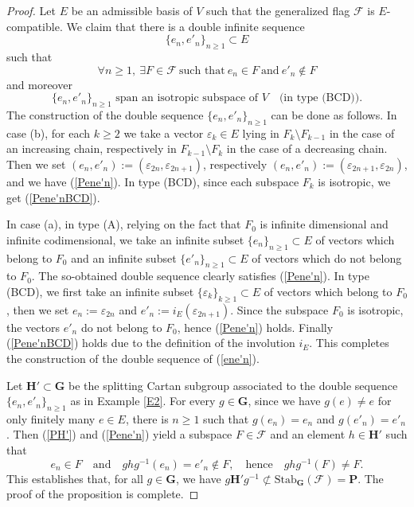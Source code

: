 \documentclass[12pt]{amsart}
\newcommand{\G}{\mathbf{G}}
\renewcommand{\H}{\mathbf{H}}
\renewcommand{\P}{\mathbf{P}}
\newcommand{\Ff}{\mathcal{F}}
\newcommand{\Stab}{\mathrm{Stab}}
\numberwithin{equation}{section}
\theoremstyle{definition}
\begin{document}
\begin{proof}
Let $E$ be an admissible basis of $V$ such that the generalized flag $\Ff$ is $E$-compatible.
We claim that there is a double infinite sequence
\begin{equation}
\label{ene'n}
\{e_n,e'_n\}_{n\geq 1}\subset E
\end{equation}
such that
\begin{equation}
\label{Pene'n}
\forall n\geq 1,\ \exists F\in\Ff\ \mbox{such that}\  e_n\in F\ \mbox{and}\  e'_n\notin F
\end{equation}
and moreover
\begin{equation}
\label{Pene'nBCD}
\mbox{$\{e_n,e'_n\}_{n\geq 1}$ span an isotropic subspace of $V$}\quad\mbox{(in type (BCD)).}
\end{equation}
The construction of the double sequence $\{e_n,e'_n\}_{n\geq 1}$ can be done as follows. In case (b), for each $k\geq 2$ we take a vector $\varepsilon_k\in E$ lying in $F_k\setminus F_{k-1}$ in the case of an increasing chain,
respectively in $F_{k-1}\setminus F_{k}$ in the case of a decreasing chain. 
Then we set $(e_n,e'_n):=(\varepsilon_{2n},\varepsilon_{2n+1})$, respectively $(e_n,e'_n):=(\varepsilon_{2n+1},\varepsilon_{2n})$, 
and we have (\ref{Pene'n}). In type (BCD), since each subspace $F_k$ is isotropic, we get (\ref{Pene'nBCD}).

In case (a), in type (A), relying on the fact that $F_0$ is infinite dimensional and infinite codimensional, we take an infinite subset $\{e_n\}_{n\geq 1}\subset E$ of vectors which belong to $F_0$ and an infinite subset $\{e'_n\}_{n\geq 1}\subset E$ of vectors which do not belong to $F_0$. The so-obtained double sequence clearly satisfies (\ref{Pene'n}). In type (BCD), we first take an infinite subset $\{\varepsilon_k\}_{k\geq 1}\subset E$ of vectors which belong to $F_0$, then we set $e_n:=\varepsilon_{2n}$ and $e'_n:=i_E(\varepsilon_{2n+1})$. Since the subspace $F_0$ is isotropic, the vectors $e'_n$ do not belong to $F_0$, hence (\ref{Pene'n}) holds. Finally (\ref{Pene'nBCD}) holds due to the definition of the involution $i_E$. This completes the construction of the double sequence of (\ref{ene'n}).

Let $\H'\subset \G$ be the splitting Cartan subgroup associated to the double sequence $\{e_n,e'_n\}_{n\geq 1}$ as in Example \ref{E2}.
For every $g\in\G$, since
we have $g(e)\not=e$ for only finitely many $e\in E$, there is $n\geq 1$ such that $g(e_n)=e_n$ and $g(e'_n)=e'_n$. Then (\ref{PH'}) and (\ref{Pene'n})
yield a subspace $F\in\Ff$ and an element $h\in\H'$ such that
\[e_n\in F\quad\mbox{and}\quad ghg^{-1}(e_n)=e'_n\notin F,\quad\mbox{hence}\quad ghg^{-1}(F)\not=F.\]
This establishes that, for all $g\in\G$, we have $g\H'g^{-1}\not\subset\Stab_\G(\Ff)=\P$. The proof of the proposition is complete.
\end{proof}
\end{document}
